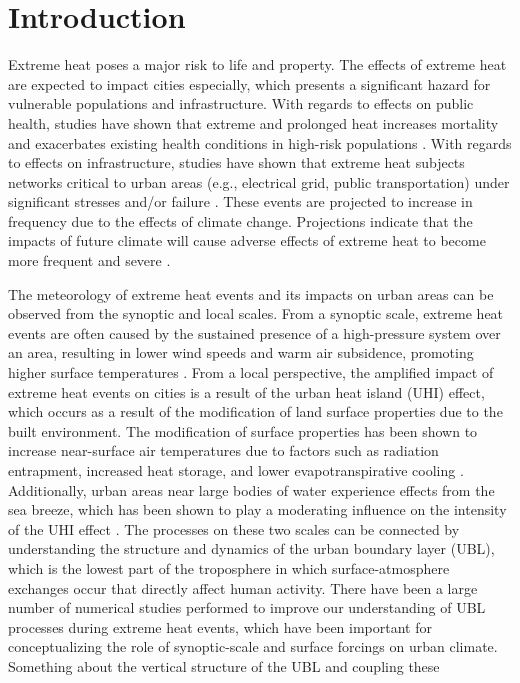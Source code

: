 \documentclass[11pt,a4paper]{article}
\begin{document}
\section{Introduction}

Extreme heat poses a major risk to life and property. The effects of extreme heat are expected to impact cities especially, which presents a significant hazard for vulnerable populations and infrastructure. With regards to effects on public health, studies have shown that extreme and prolonged heat increases mortality and exacerbates existing health conditions in high-risk populations \citep{anderson2011, frumkin2016, heaviside2017, madrigano2015}. With regards to effects on infrastructure, studies have shown that extreme heat subjects networks critical to urban areas (e.g., electrical grid, public transportation) under significant stresses and/or failure \citep{mcevoy2012, zuo2015}. These events are projected to increase in frequency due to the effects of climate change. Projections indicate that the impacts of future climate will cause adverse effects of extreme heat to become more frequent and severe \citep{burillo2019, forzieri2018, peng2011}.

The meteorology of extreme heat events and its impacts on urban areas can be observed from the synoptic and local scales. From a synoptic scale, extreme heat events are often caused by the sustained presence of a high-pressure system over an area, resulting in lower wind speeds and warm air subsidence, promoting higher surface temperatures \citep{black2004, miralles2014}. From a local perspective, the amplified impact of extreme heat events on cities is a result of the urban heat island (UHI) effect, which occurs as a result of the modification of land surface properties due to the built environment. The modification of surface properties has been shown to increase near-surface air temperatures due to factors such as radiation entrapment, increased heat storage, and lower evapotranspirative cooling \citep{chen2014, li2013, ramamurthy2017, zhao2018}. Additionally, urban areas near large bodies of water experience effects from the sea breeze, which has been shown to play a moderating influence on the intensity of the UHI effect \citep{hu2016, jiang2019, stefanon2014}. The processes on these two scales can be connected by understanding the structure and dynamics of the urban boundary layer (UBL), which is the lowest part of the troposphere in which surface-atmosphere exchanges occur that directly affect human activity. There have been a large number of numerical studies performed to improve our understanding of UBL processes during extreme heat events, which have been important for conceptualizing the role of synoptic-scale and surface forcings on urban climate. Something about the vertical structure of the UBL and coupling these
\end{document}
